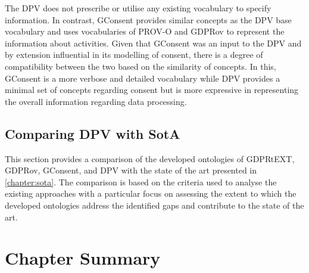 The DPV does not prescribe or utilise any existing vocabulary to specify information.
In contrast, GConsent provides similar concepts as the DPV base vocabulary and uses vocabularies of PROV-O and GDPRov to represent the information about activities.
Given that GConsent was an input to the DPV and by extension influential in its modelling of consent, there is a degree of compatibility between the two based on the similarity of concepts.
In this, GConsent is a more verbose and detailed vocabulary while DPV provides a minimal set of concepts regarding consent but is more expressive in representing the overall information regarding data processing.

\subsection{Comparing DPV with SotA}\label{sec:voc:dpv-sota}
This section provides a comparison of the developed ontologies of GDPRtEXT, GDPRov, GConsent, and DPV with the state of the art presented in \autoref{chapter:sota}.
The comparison is based on the criteria used to analyse the existing approaches with a particular focus on assessing the extent to which the developed ontologies address the identified gaps and contribute to the state of the art.

\section*{Chapter Summary}
